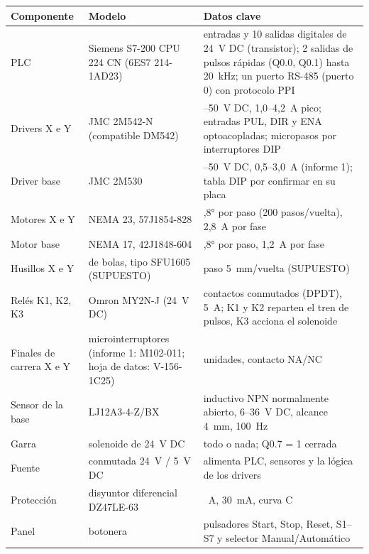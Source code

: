 \begin{center}\small
\begin{longtable}{>{\raggedright}p{3.2cm} >{\raggedright}p{4cm} >{\raggedright\arraybackslash}p{7.8cm}}
\toprule
\textbf{Componente} & \textbf{Modelo} & \textbf{Datos clave}\\
\midrule
\endhead
PLC & Siemens S7-200 CPU 224 CN (6ES7 214-1AD23) & 14 entradas y 10 salidas digitales de 24~V DC (transistor); 2 salidas de pulsos rápidas (Q0.0, Q0.1) hasta 20~kHz; un puerto RS-485 (puerto 0) con protocolo PPI\\
Drivers X e Y & JMC 2M542-N (compatible DM542) & 20--50~V DC, 1,0--4,2~A pico; entradas PUL, DIR y ENA optoacopladas; micropasos por interruptores DIP\\
Driver base & JMC 2M530 & 18--50~V DC, 0,5--3,0~A (informe 1); tabla DIP por confirmar en su placa\\
Motores X e Y & NEMA 23, 57J1854-828 & 1,8° por paso (200 pasos/vuelta), 2,8~A por fase\\
Motor base & NEMA 17, 42J1848-604 & 1,8° por paso, 1,2~A por fase\\
Husillos X e Y & de bolas, tipo SFU1605 (SUPUESTO) & paso 5~mm/vuelta (SUPUESTO)\\
Relés K1, K2, K3 & Omron MY2N-J (24~V DC) & 2 contactos conmutados (DPDT), 5~A; K1 y K2 reparten el tren de pulsos, K3 acciona el solenoide\\
Finales de carrera X e Y & microinterruptores (informe 1: M102-011; hoja de datos: V-156-1C25) & 4 unidades, contacto NA/NC\\
Sensor de la base & LJ12A3-4-Z/BX & inductivo NPN normalmente abierto, 6--36~V DC, alcance 4~mm, 100~Hz\\
Garra & solenoide de 24~V DC & todo o nada; Q0.7 = 1 cerrada\\
Fuente & conmutada 24~V / 5~V DC & alimenta PLC, sensores y la lógica de los drivers\\
Protección & disyuntor diferencial DZ47LE-63 & 16~A, 30~mA, curva C\\
Panel & botonera & pulsadores Start, Stop, Reset, S1--S7 y selector Manual/Automático\\
\bottomrule
\end{longtable}
\end{center}

